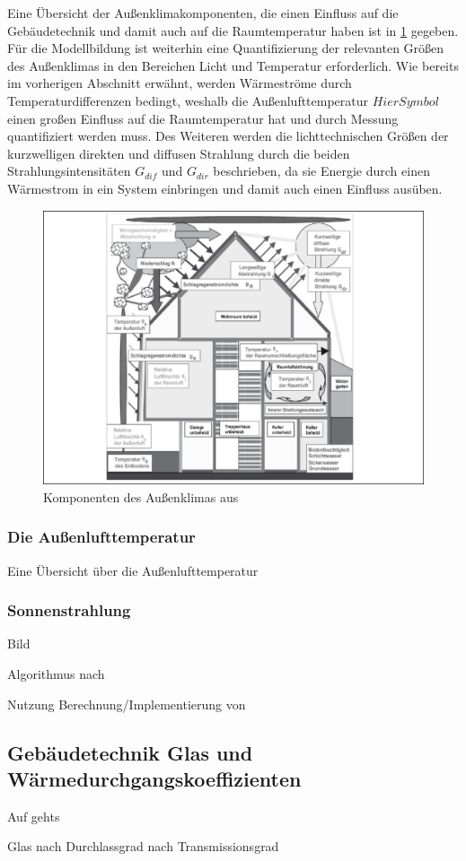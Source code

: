 Eine Übersicht der Außenklimakomponenten, die einen Einfluss auf die Gebäudetechnik und damit auch auf die Raumtemperatur haben ist in \ref{fig:aussenklima} gegeben. Für die Modellbildung ist weiterhin eine Quantifizierung der relevanten Größen des Außenklimas in den Bereichen Licht und Temperatur erforderlich. Wie bereits im vorherigen Abschnitt erwähnt, werden Wärmeströme durch Temperaturdifferenzen bedingt, weshalb die Außenlufttemperatur $Hier Symbol$ einen großen Einfluss auf die Raumtemperatur hat und durch Messung quantifiziert werden muss. Des Weiteren werden die lichttechnischen Größen der kurzwelligen direkten und diffusen Strahlung durch die beiden Strahlungsintensitäten $G_{dif}$ und $G_{dir}$ beschrieben, da sie Energie durch einen Wärmestrom in ein System einbringen und damit auch einen Einfluss ausüben.

\begin{figure}
\centering
\includegraphics[width=\textwidth]{abbildungen/20160322_aussenklima}
\caption[Komponenten des Außenklimas]{Komponenten des Außenklimas aus \cite[S.~298]{ha13}}
\label{fig:aussenklima}
\end{figure}

\subsubsection{Die Außenlufttemperatur}
Eine Übersicht über die Außenlufttemperatur  


\subsubsection{Sonnenstrahlung}

\cite{therakles13}
\cite[S.~63ff.]{qu11}
\cite[S.~61ff.]{ka13}
\cite[S.~315ff.]{ha13} Bild

Algorithmus nach \cite{re08}

Nutzung Berechnung/Implementierung von \cite{pysolar}

\subsection{Gebäudetechnik Glas und Wärmedurchgangskoeffizienten}
Auf gehts

Glas nach \cite[S.~61ff.]{ha13}
Durchlassgrad nach \cite[S.~604ff.]{ha13}
Transmissionsgrad 



